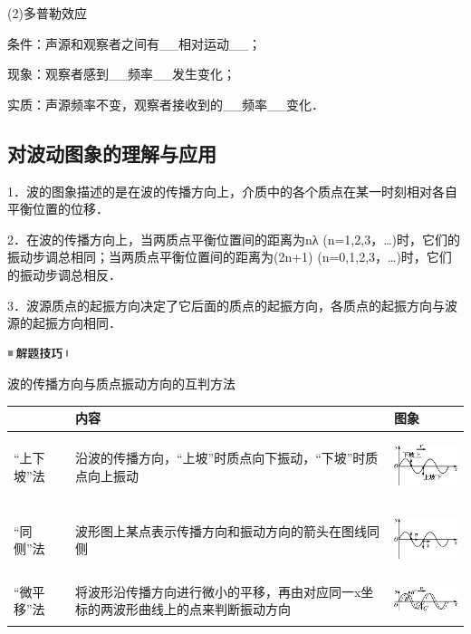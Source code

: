 (2)多普勒效应

条件：声源和观察者之间有\_\_相对运动\_\_；

现象：观察者感到\_\_频率\_\_发生变化；

实质：声源频率不变，观察者接收到的\_\_频率\_\_变化．
\subsection{对波动图象的理解与应用}

1．波的图象描述的是在波的传播方向上，介质中的各个质点在某一时刻相对各自平衡位置的位移．

2．在波的传播方向上，当两质点平衡位置间的距离为nλ
(n=1,2,3，\ldots)时，它们的振动步调总相同；当两质点平衡位置间的距离为(2n+1)
(n=0,1,2,3，\ldots)时，它们的振动步调总相反．

3．波源质点的起振方向决定了它后面的质点的起振方向，各质点的起振方向与波源的起振方向相同．

\begin{center}\includegraphics[width=0.70764in,height=0.12292in]{media/image37.png}\end{center}
波的传播方向与质点振动方向的互判方法

\begin{longtable}[]{@{}lll@{}}
\toprule
& 内容 & 图象\tabularnewline
\midrule
\endhead
``上下坡''法 &
沿波的传播方向，``上坡''时质点向下振动，``下坡''时质点向上振动 &
\includegraphics[width=1.13194in,height=0.73611in]{media/image528.png}\tabularnewline
``同侧''法 & 波形图上某点表示传播方向和振动方向的箭头在图线同侧 &
\includegraphics[width=1.13194in,height=0.73611in]{media/image529.png}\tabularnewline
``微平移''法 &
将波形沿传播方向进行微小的平移，再由对应同一x坐标的两波形曲线上的点来判断振动方向
&
\includegraphics[width=1.18889in,height=0.45278in]{media/image530.png}\tabularnewline
\bottomrule
\end{longtable}


